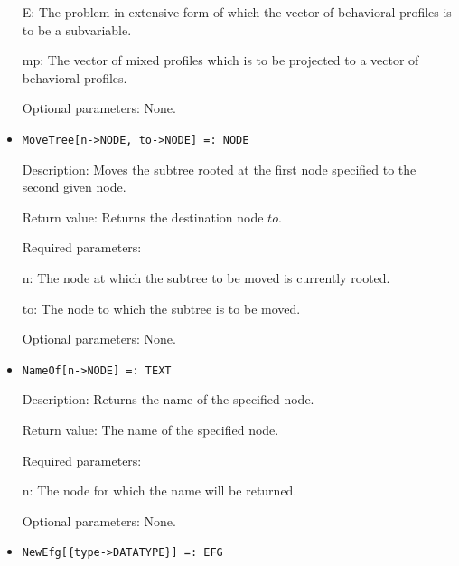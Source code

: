 \begin{itemize}
\bd
\item
[E:] The problem in extensive form of which the vector of behavioral
profiles is to be a subvariable.
\item
[mp:] The vector of mixed profiles which is to be projected to a
vector of behavioral profiles.
\ed

\item
[Optional parameters:] None.
\ed

\item
\protect \large \begin{verbatim}
MoveTree[n->NODE, to->NODE] =: NODE
\end{verbatim}\normalsize

\bd
\item
[Description:] Moves the subtree rooted at the first node specified to
the second given node.
\item
[Return value:] Returns the destination node $to$.
\item
[Required parameters:]\hfil\null
	  
\bd
\item
[n:] The node at which the subtree to be moved is currently rooted.
\item
[to:] The node to which the subtree is to be moved.
\ed

\item
[Optional parameters:] None.
\ed


\item
\protect \large \begin{verbatim}
NameOf[n->NODE] =: TEXT
\end{verbatim}\normalsize

\bd
\item
[Description:] Returns the name of the specified node.
\item
[Return value:] The name of the specified node.
\item
[Required parameters:]\hfil\null

\bd
\item
[n:] The node for which the name will be returned.
\ed

\item
[Optional parameters:] None.
\ed

\item
\protect \large \begin{verbatim}
NewEfg[{type->DATATYPE}] =: EFG
\end{verbatim}\normalsize


\end{itemize}

